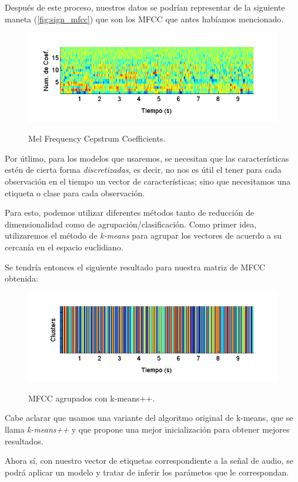 Después de este proceso, nuestros datos se podrían representar de la siguiente maneta (\autoref{fig:sign_mfcc}) que son los MFCC que antes habíamos mencionado.
\begin{figure}[bth]
  \myfloatalign
  {\includegraphics[width=0.9\linewidth]{gfx/chap5/signal-mfcc}} \quad
  \caption{Mel Frequency Cepstrum Coefficients.}
  \label{fig:sign_mfcc}
\end{figure}

Por útlimo, para los modelos que usaremos, se necesitan que las características estén de cierta forma \textit{discretizadas}, es decir, no nos es útil el tener para cada observación en el tiempo un vector de características; sino que necesitamos una etiqueta o clase para cada observación. 

Para esto, podemos utilizar diferentes métodos tanto de reducción de dimensionalidad como de agrupación/clasificación. Como primer idea, utilizaremos el método de \textit{k-means} para agrupar los vectores de acuerdo a su cercanía en el espacio euclidiano.

Se tendría entonces el siguiente resultado para nuestra matriz de MFCC obtenida:
\begin{figure}[bth]
  \myfloatalign
  {\includegraphics[width=0.9\linewidth]{gfx/chap5/signal-clusters}} \quad
  \caption{MFCC agrupados con k-means++.}
  \label{fig:sign_clusters}
\end{figure}
Cabe aclarar que usamos una variante del algoritmo original de k-means, que se llama \textit{k-means++} y que propone una mejor inicialización para obtener mejores resultados.

Ahora sí, con nuestro vector de etiquetas correspondiente a la señal de audio, se podrá aplicar un modelo y tratar de inferir los parámetos que le correspondan.